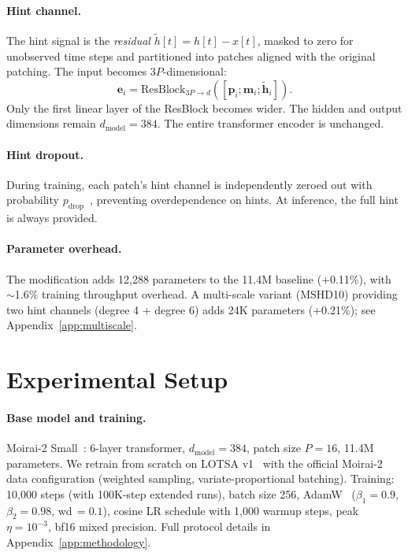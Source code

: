 \documentclass{article}
\begin{document}
\paragraph{Hint channel.} The hint signal is the \emph{residual} $\tilde{h}[t] = h[t] - x[t]$, masked to zero for unobserved time steps and partitioned into patches aligned with the original patching. The input becomes $3P$-dimensional:
\begin{equation}
\mathbf{e}_i = \text{ResBlock}_{3P \to d}([\mathbf{p}_i; \mathbf{m}_i; \tilde{\mathbf{h}}_i]).
\end{equation}
Only the first linear layer of the ResBlock becomes wider. The hidden and output dimensions remain $d_{\text{model}} = 384$. The entire transformer encoder is unchanged.

\paragraph{Hint dropout.} During training, each patch's hint channel is independently zeroed out with probability $p_{\text{drop}}$~\citep{srivastava2014dropout}, preventing overdependence on hints. At inference, the full hint is always provided.

\paragraph{Parameter overhead.} The modification adds 12,288 parameters to the 11.4M baseline (+0.11\%), with $\sim$1.6\% training throughput overhead. A multi-scale variant (MSHD10) providing two hint channels (degree 4 + degree 6) adds 24K parameters (+0.21\%); see Appendix~\ref{app:multiscale}.

\section{Experimental Setup}

\paragraph{Base model and training.} Moirai-2 Small~\citep{liu2024moirai2}: 6-layer transformer, $d_{\text{model}}{=}384$, patch size $P{=}16$, 11.4M parameters. We retrain from scratch on LOTSA v1~\citep{woo2024unified} with the official Moirai-2 data configuration (weighted sampling, variate-proportional batching). Training: 10,000 steps (with 100K-step extended runs), batch size 256, AdamW~\citep{loshchilov2019decoupled} ($\beta_1{=}0.9$, $\beta_2{=}0.98$, wd$\,{=}0.1$), cosine LR schedule with 1,000 warmup steps, peak $\eta{=}10^{-3}$, bf16 mixed precision. Full protocol details in Appendix~\ref{app:methodology}.
\end{document}
